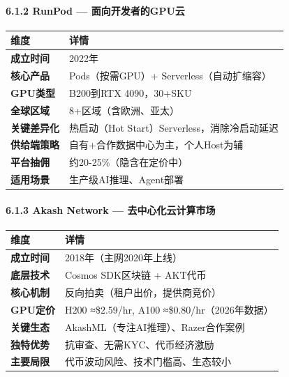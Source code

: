 \documentclass[UTF8,a4paper,12pt]{ctexart}
\begin{document}
\paragraph{6.1.2 RunPod ---
面向开发者的GPU云}\label{runpod-ux9762ux5411ux5f00ux53d1ux8005ux7684gpuux4e91}

{\def\LTcaptype{none} %
\begin{longtable}[]{@{}ll@{}}
\toprule\noalign{}
维度 & 详情 \\
\midrule\noalign{}
\endhead
\bottomrule\noalign{}
\endlastfoot
\textbf{成立时间} & 2022年 \\
\textbf{核心产品} & Pods（按需GPU）+ Serverless（自动扩缩容） \\
\textbf{GPU类型} & B200到RTX 4090，30+SKU \\
\textbf{全球区域} & 8+区域（含欧洲、亚太） \\
\textbf{关键差异化} & 热启动（Hot Start）Serverless，消除冷启动延迟 \\
\textbf{供给端策略} & 自有+合作数据中心为主，个人Host为辅 \\
\textbf{平台抽佣} & 约20-25\%（隐含在定价中） \\
\textbf{适用场景} & 生产级AI推理、Agent部署 \\
\end{longtable}
}

\paragraph{6.1.3 Akash Network ---
去中心化云计算市场}\label{akash-network-ux53bbux4e2dux5fc3ux5316ux4e91ux8ba1ux7b97ux5e02ux573a}

{\def\LTcaptype{none} %
\begin{longtable}[]{@{}ll@{}}
\toprule\noalign{}
维度 & 详情 \\
\midrule\noalign{}
\endhead
\bottomrule\noalign{}
\endlastfoot
\textbf{成立时间} & 2018年（主网2020年上线） \\
\textbf{底层技术} & Cosmos SDK区块链 + AKT代币 \\
\textbf{核心机制} & 反向拍卖（租户出价，提供商竞价） \\
\textbf{GPU定价} & H200 ≈\$2.59/hr, A100 ≈\$0.80/hr（2026年数据） \\
\textbf{关键生态} & AkashML（专注AI推理）、Razer合作案例 \\
\textbf{独特优势} & 抗审查、无需KYC、代币经济激励 \\
\textbf{主要局限} & 代币波动风险、技术门槛高、生态较小 \\
\end{longtable}
}
\end{document}
